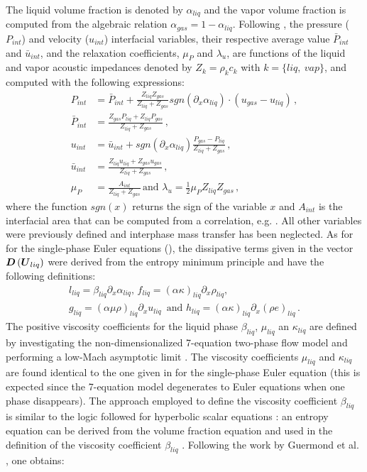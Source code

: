 \documentclass{mc2015}
\begin{document}
%
The liquid volume fraction is denoted by  $\alpha_{liq}$ and the vapor volume fraction is computed from the algebraic relation $\alpha_{gas} = 1 - \alpha_{liq}$. Following \cite{SEM}, the pressure ($P_{int}$) and velocity ($u_{int}$) interfacial variables, their respective average value $\bar{P}_{int}$ and $\bar{u}_{int}$, and the relaxation coefficients, $\mu_P$ and $\lambda_u$, are functions of the liquid and vapor acoustic impedances denoted by $Z_k = \rho_k c_k$ with $k = \{ liq, \ vap \}$, and computed with the following expressions:
%
\begin{subequations}
\label{eq:int_variables_def}
\begin{align}
  \label{E-R:83}
  P_{int} &= \bar{P}_{int} + \frac{Z_{liq}Z_{gas}}{Z_{liq}+Z_{gas}} sgn \left( \partial_x \alpha_{liq} \right) \cdot (u_{gas}-u_{liq}) \,,
  \\
  \bar{P}_{int} &= \frac{Z_{gas} P_{liq}+Z_{liq}P_{gas}}{Z_{liq}+Z_{gas}} \,,
 \\
  \label{E-R:84}
  u_{int} &= \bar{u}_{int} +  sgn \left( \partial_x \alpha_{liq}\right) \frac{P_{gas}-P_{liq}}{Z_{liq}+Z_{gas}} \,,
  \\
  \bar{u}_{int} &= \frac{Z_{liq} u_{liq}+Z_{gas} u_{gas}}{Z_{liq}+Z_{gas}} \, ,
  \\
  \mu_P &= \frac{A_{int}}{Z_{liq}+Z_{gas}} \, 
  \text{and }
  \lambda_u = \frac{1}{2} \mu_P Z_{liq} Z_{gas} \, ,
\end{align}
\end{subequations}
%
where the function $sgn(x)$ returns the sign of the variable $x$ and $A_{int}$ is the interfacial area that can be computed from a correlation, e.g. \cite{SEM}. All other variables were previously defined and interphase mass transfer has been neglected. As for for the single-phase Euler equations (), the dissipative terms given in the vector $\boldsymbol D\left( \boldsymbol U_{liq} \right)$ were derived from the entropy minimum principle and have the following definitions:
%
\begin{multline}
l_{liq} = \beta_{liq} \partial_x \alpha_{liq} , \, f_{liq}= ( \alpha \kappa )_{liq} \partial_x \rho_{liq} , \\ g_{liq} = ( \alpha \mu \rho )_{liq} \partial_x u_{liq} \, \text{ and } h_{liq} = ( \alpha \kappa )_{liq} \partial_x \left( \rho e \right)_{liq} \, . \nonumber
\end{multline}
%
The positive viscosity coefficients for the liquid phase $\beta_{liq}$, $\mu_{liq}$ an $\kappa_{liq}$ are defined by investigating the non-dimensionalized 7-equation two-phase flow model and performing a low-Mach asymptotic limit \cite{Marco_paper_7_equ}. The viscosity coefficients $\mu_{liq}$ and $\kappa_{liq}$ are found identical to the one given in  for the single-phase Euler equation (this is expected since the 7-equation model degenerates to Euler equations when one phase disappears). The approach employed to define the viscosity coefficient $\beta_{liq}$ is similar to the logic followed for hyperbolic scalar equations \cite{jlg1, jlg2}: an entropy equation can be derived from the volume fraction equation and used in the definition of the viscosity coefficient $\beta_{liq}$ . Following the work by Guermond et al. \cite{jlg1, jlg2}, one obtains:
\end{document}
